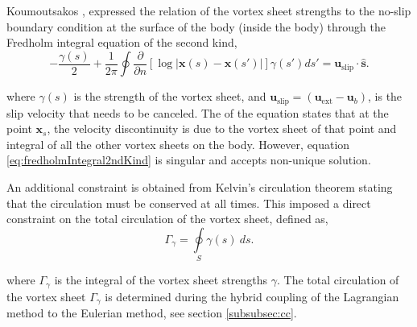 Koumoutsakos \cite{Koumoutsakos1993b}, expressed the relation of the vortex sheet strengths to the no-slip boundary condition at the surface of the body (inside the body) through the Fredholm integral equation of the second kind,
	\begin{equation}
	-\frac{\gamma\left(s\right)}{2} + \frac{1}{2\pi}\oint\frac{\partial}{\partial n}\left[\log\left|\mathbf{x}\left(s\right)-\mathbf{x}\left(s'\right)\right|\right]\gamma\left(s'\right)ds'= \mathbf{u}_{\mathrm{slip}}\cdot\mathbf{\hat{s}}.
	\label{eq:fredholmIntegral2ndKind}
	\end{equation}

where $\gamma(s)$ is the strength of the vortex sheet, and $\mathbf{u}_{\mathrm{slip}} = (\mathbf{u}_{\mathrm{ext}}-\mathbf{u}_{b})$, is the slip velocity that needs to be canceled. The  of the equation states that at the point $\mathbf{x}_s$, the velocity discontinuity is due to the vortex sheet of that point and integral of all the other vortex sheets on the body. However, equation \ref{eq:fredholmIntegral2ndKind} is singular and accepts non-unique solution. 

An additional constraint is obtained from Kelvin's circulation theorem stating that the circulation must be conserved at all times. This imposed a direct constraint on the total circulation of the vortex sheet, defined as,
	\begin{equation}
	\Gamma_{\gamma} = \oint\limits_S\gamma\left(s\right)\ d s.
	\label{eq:circulationConstraintonPanels}
	\end{equation}

where $\Gamma_{\gamma}$ is the integral of the vortex sheet strengths $\gamma$. The total circulation of the vortex sheet $\Gamma_{\gamma}$ is determined during the hybrid coupling of the Lagrangian method to the Eulerian method, see section \ref{subsubsec:cc}.



